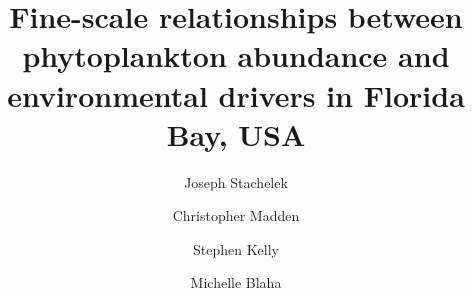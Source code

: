 %
%
%
%
%
%
\RequirePackage{fix-cm}
%
\documentclass[smallextended]{svjour3}       %
%
\smartqed  %
%
\usepackage{graphicx}
%
%
\usepackage[numbers]{natbib}
\usepackage{siunitx}
\usepackage{hyperref}
%
%
%


\title{Fine-scale relationships between phytoplankton abundance and environmental drivers in Florida Bay, USA%
}


\author{Joseph Stachelek         \and
        Christopher Madden  \and
        Stephen Kelly \and
        Michelle Blaha
}

